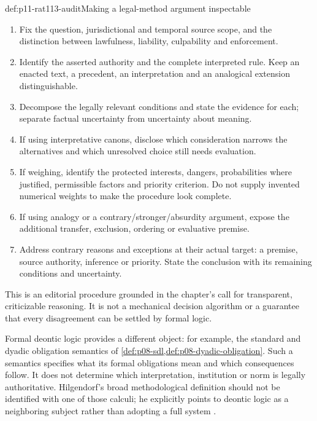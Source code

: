 \begin{hbmethod}{def:p11-rat113-audit}{Making a legal-method argument inspectable}
\begin{enumerate}
\item Fix the question, jurisdictional and temporal source scope, and the
      distinction between lawfulness, liability, culpability and enforcement.
\item Identify the asserted authority and the complete interpreted rule.
      Keep an enacted text, a precedent, an interpretation and an analogical
      extension distinguishable.
\item Decompose the legally relevant conditions and state the evidence for
      each; separate factual uncertainty from uncertainty about meaning.
\item If using interpretative canons, disclose which consideration narrows
      the alternatives and which unresolved choice still needs evaluation.
\item If weighing, identify the protected interests, dangers, probabilities
      where justified, permissible factors and priority criterion. Do not
      supply invented numerical weights to make the procedure look complete.
\item If using analogy or a contrary/stronger/absurdity argument, expose the
      additional transfer, exclusion, ordering or evaluative premise.
\item Address contrary reasons and exceptions at their actual target: a
      premise, source authority, inference or priority. State the conclusion
      with its remaining conditions and uncertainty.
\end{enumerate}
This is an editorial procedure grounded in the chapter's call for transparent,
criticizable reasoning. It is not a mechanical decision algorithm or a
guarantee that every disagreement can be settled by formal logic.
\end{hbmethod}

Formal deontic logic provides a different object: for example, the standard
and dyadic obligation semantics of
\cref{def:p08-sdl,def:p08-dyadic-obligation}. Such a semantics specifies
what its formal obligations mean and which consequences follow. It does
not determine which interpretation, institution or norm is legally
authoritative. Hilgendorf's broad methodological definition should not be
identified with one of those calculi; he explicitly points to deontic logic
as a neighboring subject rather than adopting a full system
\parencite[p.~659, note~3 on p.~665]{Hilgendorf2021LegalLogic}.

